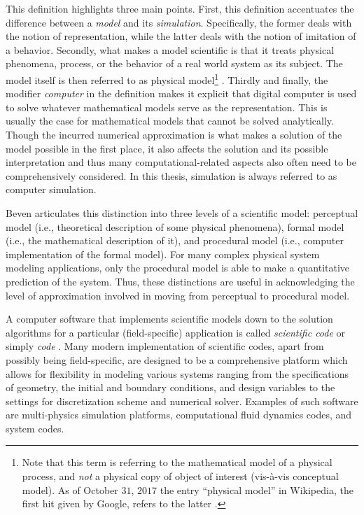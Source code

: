 This definition highlights three main points.
First, this definition accentuates the difference between a \emph{model} and its \emph{simulation}.
Specifically, the former deals with the notion of representation, while the latter deals with the notion of imitation of a behavior.
Secondly, what makes a model scientific is that it treats physical phenomena, process, or the behavior of a real world system as its subject.
The model itself is then referred to as physical model\footnote{Note that this term is referring to the mathematical model of a physical process, and \emph{not} a physical copy of object of interest (vis-à-vis conceptual model). As of October $31$, $2017$ the entry ``physical model'' in Wikipedia, the first hit given by Google, refers to the latter \cite{Wikipedia2017}.} .
Thirdly and finally, the modifier \emph{computer} in the definition makes it explicit that digital computer is used to solve whatever mathematical models serve as the representation.
This is usually the case for mathematical models that cannot be solved analytically.
Though the incurred numerical approximation is what makes a solution of the model possible in the first place, 
it also affects the solution and its possible interpretation and thus many computational-related aspects also often need to be comprehensively considered.
In this thesis, simulation is always referred to as computer simulation.

Beven \cite{Beven2009} articulates this distinction into three levels of a scientific model: perceptual model (i.e., theoretical description of some physical phenomena),
formal model (i.e., the mathematical description of it),
and procedural model (i.e., computer implementation of the formal model).
For many complex physical system modeling applications, only the procedural model is able to make a quantitative prediction of the system.
Thus, these distinctions are useful in acknowledging the level of approximation involved in moving from perceptual to procedural model.

A computer software that implements scientific models down to the solution algorithms for a particular (field-specific) application is called \emph{scientific code} or simply \emph{code} \cite{Trucano2006}.
Many modern implementation of scientific codes, apart from possibly being field-specific, are designed to be a comprehensive platform which allows for flexibility in modeling various systems ranging from the specifications of geometry, the initial and boundary conditions, and design variables to the settings for discretization scheme and numerical solver.
Examples of such software are multi-physics simulation platforms, computational fluid dynamics codes, and  system codes.

